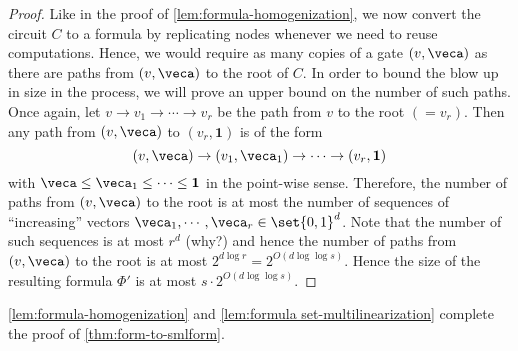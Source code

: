 \begin{proof}
Like in the proof of \autoref{lem:formula-homogenization}, we now convert the circuit $C$ to a formula by replicating nodes whenever we need to reuse computations.
Hence, we would require as many copies of a gate $(v, \veca)$ as there are paths from $(v,\veca)$ to the root of $C$.
In order to bound the blow up in size in the process, we will prove an upper bound on the number of such paths.
Once again, let $v \rightarrow v_1 \rightarrow \cdots \rightarrow v_r$ be the path from $v$ to the root $(=v_r)$.
Then any path from $(v,\veca)$ to $(v_r,\mathbf{1})$ is of the form
\[
(v,\veca) \rightarrow (v_1,\veca_1) \rightarrow \cdots \rightarrow (v_r,\mathbf{1})
\]
with $\veca \leq \veca_1 \leq \cdots \leq \mathbf{1}$ in the point-wise sense.
Therefore, the number of paths from $(v,\veca)$ to the root is at most the number of sequences of ``increasing'' vectors $\veca_1, \cdots, \veca_r \in \set{0,1}^d$. Note that the number of such sequences is at most $r^d$ (why?)
and hence the number of paths from $(v,\veca)$ to the root is at most $2^{d\log r} = 2^{O(d\log\log s)}$.
Hence the size of the resulting formula $\Phi'$ is at most $s \cdot 2^{O(d \log\log s)}$. 
\end{proof}

\autoref{lem:formula-homogenization} and \autoref{lem:formula set-multilinearization} complete the proof of \autoref{thm:form-to-smlform}. 





